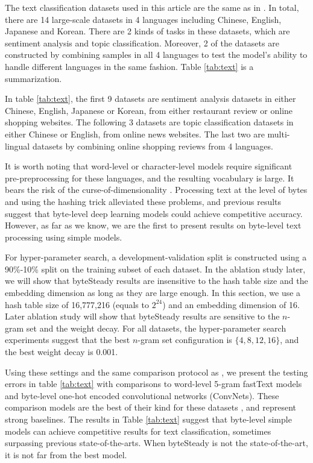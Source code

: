 \documentclass{article}
\begin{document}
The text classification datasets used in this article are the same as in \cite{ZL17}. In total, there are 14 large-scale datasets in 4 languages including Chinese, English, Japanese and Korean. There are 2 kinds of tasks in these datasets, which are sentiment analysis and topic classification. Moreover, 2 of the datasets are constructed by combining samples in all 4 languages to test the model's ability to handle different languages in the same fashion. Table \ref{tab:text} is a summarization.

In table \ref{tab:text}, the first 9 datasets are sentiment analysis datasets in either Chinese, English, Japanese or Korean, from either restaurant review or online shopping websites. The following 3 datasets are topic classification datasets in either Chinese or English, from online news websites. The last two are multi-lingual datasets by combining online shopping reviews from 4 languages.

It is worth noting that word-level or character-level models require significant pre-preprocessing for these languages, and the resulting vocabulary is large. It bears the risk of the curse-of-dimensionality \cite{BDVJ03}. Processing text at the level of bytes and using the hashing trick \cite{WDLSA09} alleviated these problems, and previous results \cite{GBVS16} \cite{ZL17} suggest that byte-level deep learning models could achieve competitive accuracy. However, as far as we know, we are the first to present results on byte-level text processing using simple models.

For hyper-parameter search, a development-validation split is constructed using a 90\%-10\% split on the training subset of each dataset. In the ablation study later, we will show that byteSteady results are insensitive to the hash table size and the embedding dimension as long as they are large enough. In this section, we use a hash table size of 16,777,216 (equals to \(2^{24}\)) and an embedding dimension of 16. Later ablation study will show that byteSteady results are sensitive to the \(n\)-gram set and the weight decay. For all datasets, the hyper-parameter search experiments suggest that the best \(n\)-gram set configuration is \(\{4,8,12,16\}\), and the best weight decay is 0.001.

Using these settings and the same comparison protocol as \cite{ZL17}, we present the testing errors in table \ref{tab:text} with comparisons to word-level 5-gram fastText models and byte-level one-hot encoded convolutional networks (ConvNets). These comparison models are the best of their kind for these datasets \cite{ZL17}, and represent strong baselines. The results in Table \ref{tab:text} suggest that byte-level simple models can achieve competitive results for text classification, sometimes surpassing previous state-of-the-arts. When byteSteady is not the state-of-the-art, it is not far from the best model.
\end{document}

